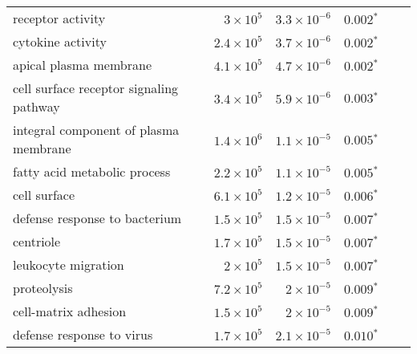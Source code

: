 \begin{longtable*}{|l|r|r|r|r|r|}
    receptor activity                                   & $ 3\times 10^{5}$  & $3.3\times 10^{-6}$  & $\bm{ 0.002{^*}}$                                        \\
    cytokine activity                                   & $2.4\times 10^{5}$ & $3.7\times 10^{-6}$  & $\bm{ 0.002{^*}}$                                        \\
    apical plasma membrane                              & $4.1\times 10^{5}$ & $4.7\times 10^{-6}$  & $\bm{ 0.002{^*}}$                                        \\
    cell surface receptor signaling pathway             & $3.4\times 10^{5}$ & $5.9\times 10^{-6}$  & $\bm{ 0.003{^*}}$                                        \\
    integral component of plasma membrane               & $1.4\times 10^{6}$ & $1.1\times 10^{-5}$  & $\bm{ 0.005{^*}}$                                        \\
    fatty acid metabolic process                        & $2.2\times 10^{5}$ & $1.1\times 10^{-5}$  & $\bm{ 0.005{^*}}$                                        \\
    cell surface                                        & $6.1\times 10^{5}$ & $1.2\times 10^{-5}$  & $\bm{ 0.006{^*}}$                                        \\
    defense response to bacterium                       & $1.5\times 10^{5}$ & $1.5\times 10^{-5}$  & $\bm{ 0.007{^*}}$                                        \\
    centriole                                           & $1.7\times 10^{5}$ & $1.5\times 10^{-5}$  & $\bm{ 0.007{^*}}$                                        \\
    leukocyte migration                                 & $ 2\times 10^{5}$  & $1.5\times 10^{-5}$  & $\bm{ 0.007{^*}}$                                        \\
    proteolysis                                         & $7.2\times 10^{5}$ & $ 2\times 10^{-5}$   & $\bm{ 0.009{^*}}$                                        \\
    cell-matrix adhesion                                & $1.5\times 10^{5}$ & $ 2\times 10^{-5}$   & $\bm{ 0.009{^*}}$                                        \\
    defense response to virus                           & $1.7\times 10^{5}$ & $2.1\times 10^{-5}$  & $\bm{ 0.010{^*}}$                                        \\

\end{longtable*}
